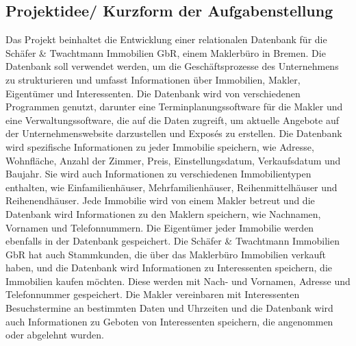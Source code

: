 \subsection{Projektidee/ Kurzform der Aufgabenstellung}
\label{subsec:projektidee}
Das Projekt beinhaltet die Entwicklung einer relationalen Datenbank für die Schäfer \& Twachtmann Immobilien GbR, einem Maklerbüro in Bremen.
Die Datenbank soll verwendet werden, um die Geschäftsprozesse des Unternehmens zu strukturieren und umfasst Informationen über Immobilien, Makler, Eigentümer und Interessenten.
Die Datenbank wird von verschiedenen Programmen genutzt, darunter eine Terminplanungssoftware für die Makler und eine Verwaltungssoftware, die auf die Daten zugreift, um aktuelle Angebote auf der Unternehmenswebsite darzustellen und Exposés zu erstellen.
Die Datenbank wird spezifische Informationen zu jeder Immobilie speichern, wie Adresse, Wohnfläche, Anzahl der Zimmer, Preis, Einstellungsdatum, Verkaufsdatum und Baujahr.
Sie wird auch Informationen zu verschiedenen Immobilientypen enthalten, wie Einfamilienhäuser, Mehrfamilienhäuser, Reihenmittelhäuser und Reihenendhäuser.
Jede Immobilie wird von einem Makler betreut und die Datenbank wird Informationen zu den Maklern speichern, wie Nachnamen, Vornamen und Telefonnummern.
Die Eigentümer jeder Immobilie werden ebenfalls in der Datenbank gespeichert.
Die Schäfer \& Twachtmann Immobilien GbR hat auch Stammkunden, die über das Maklerbüro Immobilien verkauft haben, und die Datenbank wird Informationen zu Interessenten speichern, die Immobilien kaufen möchten.
Diese werden mit Nach- und Vornamen, Adresse und Telefonnummer gespeichert.
Die Makler vereinbaren mit Interessenten Besuchstermine an bestimmten Daten und Uhrzeiten und die Datenbank wird auch Informationen zu Geboten von Interessenten speichern, die angenommen oder abgelehnt wurden.

